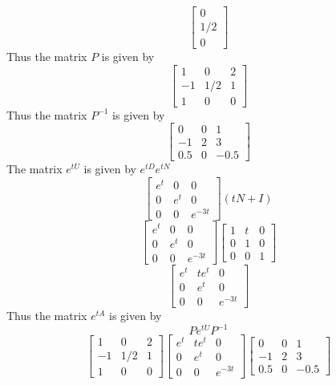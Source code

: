 \documentclass{article}
\begin{document}
$$\begin{bmatrix}
    0\\
    1/2\\
    0
\end{bmatrix}$$
Thus the matrix $P$ is given by
$$\begin{bmatrix}
    1 & 0 & 2\\
    -1 & 1/2 & 1\\
    1 & 0 & 0
\end{bmatrix}$$
Thus the matrix $P^{-1}$ is given by
$$\begin{bmatrix}
    0 & 0 & 1\\
    -1 & 2 & 3\\
    0.5 & 0 & -0.5
\end{bmatrix}$$
The matrix $e^{tU}$ is given by $e^{tD}e^{tN}$
$$\begin{bmatrix}
    e^t & 0 & 0\\
    0 & e^t & 0\\
    0 & 0 & e^{-3t}
\end{bmatrix}(tN + I)$$
$$\begin{bmatrix}
    e^t & 0 & 0\\
    0 & e^t & 0\\
    0 & 0 & e^{-3t}
\end{bmatrix} \begin{bmatrix}
        1 & t & 0\\
        0 & 1 & 0\\
        0 & 0 & 1
    \end{bmatrix}$$
$$\begin{bmatrix}
        e^t & te^t & 0\\
        0 & e^t & 0\\
        0 & 0 & e^{-3t}
\end{bmatrix}$$
Thus the matrix $e^{tA}$ is given by
$$P e^{tU} P^{-1}$$
$$\begin{bmatrix}
    1 & 0 & 2\\
    -1 & 1/2 & 1\\
    1 & 0 & 0
\end{bmatrix} \begin{bmatrix}
    e^t & te^{t} & 0\\
    0 & e^t & 0\\
    0 & 0 & e^{-3t}
\end{bmatrix} \begin{bmatrix}
    0 & 0 & 1\\
    -1 & 2 & 3\\
    0.5 & 0 & -0.5
\end{bmatrix}$$
\end{document}
